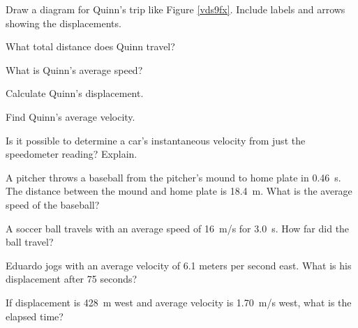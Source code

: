 \documentclass[main.tex]{subfiles}
\begin{document}
\begin{exercise} \label{qquil7}
    Draw a diagram for Quinn's trip like Figure \ref{vds9fx}. Include labels and arrows showing the displacements.
\end{exercise}

\begin{exercise} \label{c7YaTG}
    What total distance does Quinn travel?
\end{exercise}

\begin{exercise} \label{ASXgWQ}
    What is Quinn's average speed?
\end{exercise}

\begin{exercise} \label{iG7rDo}
    Calculate Quinn's displacement.
\end{exercise}

\begin{exercise} \label{cIfbMu}
    Find Quinn's average velocity.
\end{exercise}

\cyanhrule

\begin{exercise} \label{JYqHaE}
    Is it possible to determine a car's instantaneous velocity from just the speedometer reading? Explain.
\end{exercise}

\begin{exercise} \label{EeYgx7}
A pitcher throws a baseball from the pitcher's mound to home plate in \SI{0.46}{s}. The distance between the mound and home plate is \SI{18.4}{m}. What is the average speed of the baseball?
\end{exercise}

\begin{exercise} \label{Zj7dfC}
    A soccer ball travels with an average speed of \SI{16}{m/s} for \SI{3.0}{s}. How far did the ball travel?
\end{exercise}

\cyanhrule

\vspace{1em}

\begin{exercise} \label{ix2lKL}
Eduardo jogs with an average velocity of 6.1 meters per second east. What is his displacement after 75 seconds?
\end{exercise}


\begin{exercise} \label{BI1eOB}
If displacement is \SI{428}{m} west and average velocity is \SI{1.70}{m/s} west, what is the elapsed time?
\end{exercise}
\end{document}
